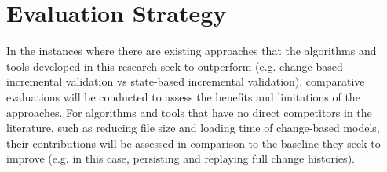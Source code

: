\documentclass[12pt, a4paper]{report} \usepackage[titletoc]{appendix}
\begin{document}
\section{Evaluation Strategy}
\label{sec:evaluation_strategy}
In the instances where there are existing approaches that the algorithms and tools developed in this research seek to outperform (e.g. change-based incremental validation vs state-based incremental validation), comparative evaluations will be conducted to assess the benefits and limitations of the approaches. For algorithms and tools that have no direct competitors in the literature, such as reducing file size and loading time of change-based models, their contributions will be assessed in comparison to the baseline they seek to improve (e.g. in this case, persisting and replaying full change histories).  
\end{document}
